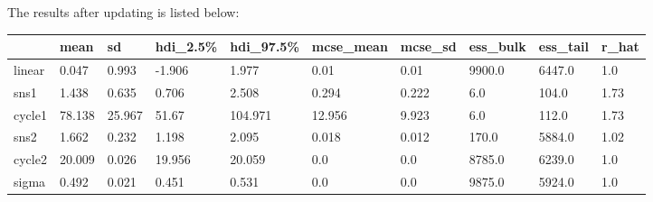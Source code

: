 \documentclass[letterpaper,12pt]{article}
\begin{document}
The results after updating is listed below:
\begin{table}[h]
	\begin{tabular}{llllllllll}
		\hline \hline
		& mean   & sd     & hdi\_2.5\% & hdi\_97.5\% & mcse\_mean & mcse\_sd & ess\_bulk & ess\_tail & r\_hat \\ \hline
		linear & 0.047  & 0.993  & -1.906     & 1.977       & 0.01       & 0.01     & 9900.0    & 6447.0    & 1.0    \\
		sns1   & 1.438  & 0.635  & 0.706      & 2.508       & 0.294      & 0.222    & 6.0       & 104.0     & 1.73   \\
		cycle1 & 78.138 & 25.967 & 51.67      & 104.971     & 12.956     & 9.923    & 6.0       & 112.0     & 1.73   \\
		sns2   & 1.662  & 0.232  & 1.198      & 2.095       & 0.018      & 0.012    & 170.0     & 5884.0    & 1.02   \\
		cycle2 & 20.009 & 0.026  & 19.956     & 20.059      & 0.0        & 0.0      & 8785.0    & 6239.0    & 1.0    \\
		sigma  & 0.492  & 0.021  & 0.451      & 0.531       & 0.0        & 0.0      & 9875.0    & 5924.0    & 1.0    \\ \hline \hline
	\end{tabular}
\end{table}
\end{document}
